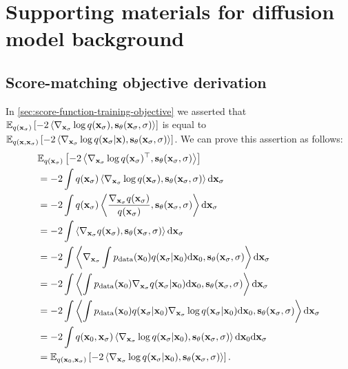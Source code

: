 \chapter{Supporting materials for diffusion model background}

\section{Score-matching objective derivation} \label{sec:proof-that-diffusion-does-score-matching}

In \cref{sec:score-function-training-objective} we asserted that $\mathbb{E}_{q({\mathbf{x}}_\sigma)} \left[ - 2 \left\langle \nabla_{{\mathbf{x}}_\sigma} \log q({\mathbf{x}}_\sigma), {\mathbf{s}}_\theta({\mathbf{x}}_\sigma, \sigma) \right\rangle \right]$ is equal to $\mathbb{E}_{q({\mathbf{x}}, {\mathbf{x}}_\sigma)} \left[ -2 \left\langle \nabla_{{\mathbf{x}}_\sigma} \log q({\mathbf{x}}_\sigma|{\mathbf{x}}), {\mathbf{s}}_\theta({\mathbf{x}}_\sigma, \sigma) \right\rangle  \right]$.
We can prove this assertion as follows:
\begin{align}
\allowdisplaybreaks
    & \EX_{q(\rvx_\sigma)} \left[ - 2 \left\langle \nabla_{\rvx_\sigma} \log q(\rvx_\sigma)^\top, \rvs_\theta(\rvx_\sigma, \sigma) \right\rangle \right] \\
    &= - 2 \int q(\rvx_\sigma) \left\langle \nabla_{\rvx_\sigma} \log q(\rvx_\sigma ), \rvs_\theta(\rvx_\sigma, \sigma) \right\rangle \mathrm{d} \rvx_\sigma  \\
    &= - 2 \int q(\rvx_\sigma ) \left\langle \frac{\nabla_{\rvx_\sigma} q(\rvx_\sigma)}{q(\rvx_\sigma )}, \rvs_\theta(\rvx_\sigma, \sigma) \right\rangle \mathrm{d} \rvx_\sigma  \\
    &= - 2 \int \left\langle \nabla_{\rvx_\sigma} q(\rvx_\sigma ), \rvs_\theta(\rvx_\sigma, \sigma) \right\rangle \mathrm{d} \rvx_\sigma  \\
    &= - 2 \int \left\langle \nabla_{\rvx_\sigma} \int \pdata(\rvx_0) q(\rvx_\sigma|\rvx_0) \mathrm{d}\rvx_0, \rvs_\theta(\rvx_\sigma, \sigma) \right\rangle \mathrm{d} \rvx_\sigma  \\
    &= - 2 \int \left\langle \int \pdata(\rvx_0) \nabla_{\rvx_\sigma} q(\rvx_\sigma|\rvx_0) \mathrm{d}\rvx_0, \rvs_\theta(\rvx_\sigma, \sigma) \right\rangle \mathrm{d} \rvx_\sigma  \\
    &= - 2 \int \left\langle \int \pdata(\rvx_0) q(\rvx_\sigma|\rvx_0) \nabla_{\rvx_\sigma} \log q(\rvx_\sigma|\rvx_0) \mathrm{d}\rvx_0, \rvs_\theta(\rvx_\sigma, \sigma) \right\rangle \mathrm{d} \rvx_\sigma  \\
    &= - 2 \int q(\rvx_0, \rvx_\sigma) \left\langle \nabla_{\rvx_\sigma} \log q(\rvx_\sigma|\rvx_0), \rvs_\theta(\rvx_\sigma, \sigma) \right\rangle  \mathrm{d}\rvx_0 \mathrm{d} \rvx_\sigma  \\
    &= \EX_{q(\rvx_0, \rvx_\sigma)} \left[ -2 \left\langle \nabla_{\rvx_\sigma} \log q(\rvx_\sigma|\rvx_0), \rvs_\theta(\rvx_\sigma, \sigma) \right\rangle  \right].
\end{align}
